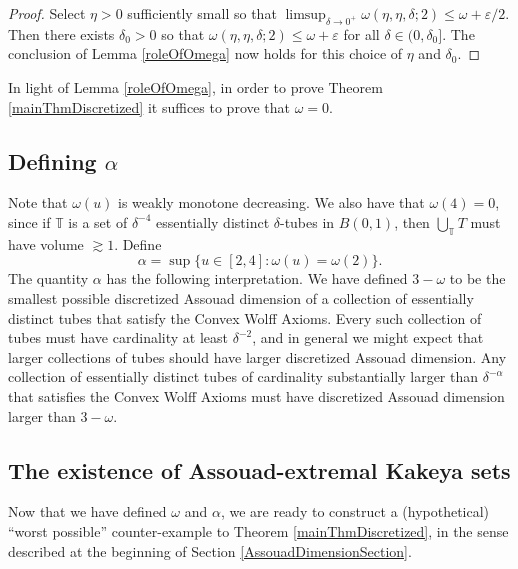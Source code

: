 \documentclass[letterpaper, reqno,11pt]{article}
\numberwithin{equation}{section}
\newcommand{\eps}{\varepsilon}
\newcommand{\tubes}{\mathbb{T}}
\numberwithin{thm}{section}
\theoremstyle{remark}
\begin{document}

\begin{proof}
Select $\eta>0$ sufficiently small so that $\limsup_{\delta\to 0^+}\omega(\eta,\eta,\delta;2)\leq \omega+\eps/2.$ Then there exists $\delta_0>0$ so that $\omega(\eta,\eta,\delta;2)\leq\omega+\eps$ for all $\delta\in (0,\delta_0]$. The conclusion of Lemma \ref{roleOfOmega} now holds for this choice of $\eta$ and $\delta_0$.
\end{proof}

In light of Lemma \ref{roleOfOmega}, in order to prove Theorem \ref{mainThmDiscretized} it suffices to prove that $\omega=0$. 


\subsection{Defining $\alpha$}\label{definingAlphaSection}
Note that $\omega(u)$ is weakly monotone decreasing. We also have that $\omega(4)=0$, since if $\tubes$ is a set of $\delta^{-4}$ essentially distinct $\delta$-tubes in $B(0,1)$, then $\bigcup_\tubes T$ must have volume $\gtrsim 1$. Define%
 \begin{equation}\label{defnAlphaEqn}
\alpha = \sup\{u\in [2,4] \colon \omega(u)=\omega(2)\}.
 \end{equation}
The quantity $\alpha$ has the following interpretation. We have defined $3-\omega$ to be the smallest possible discretized Assouad dimension of a collection of essentially distinct tubes that satisfy the Convex Wolff Axioms. Every such collection of tubes must have cardinality at least $\delta^{-2}$, and in general we might expect that larger collections of tubes should have larger discretized Assouad dimension. Any collection of essentially distinct tubes of cardinality substantially larger than $\delta^{-\alpha}$ that satisfies the Convex Wolff Axioms must have discretized Assouad dimension larger than $3-\omega$.




\subsection{The existence of Assouad-extremal Kakeya sets}
Now that we have defined $\omega$ and $\alpha$, we are ready to construct a (hypothetical) ``worst possible'' counter-example to Theorem \ref{mainThmDiscretized}, in the sense described at the beginning of Section \ref{AssouadDimensionSection}.
\end{document}
